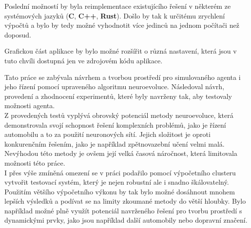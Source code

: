 Poslední možností by byla reimplementace existujícího řešení v některém ze systémových jazyků (\textbf{C}, \textbf{C++}, \textbf{Rust}). Došlo by tak k určitému zrychlení výpočtů a bylo by tedy možné vyhodnotit více jedinců na jednom počítači než doposud. 

Grafickou část aplikace by bylo možné rozšířit o různá nastavení, která jsou v tuto chvíli dostupná jen ve zdrojovém kódu aplikace.

Tato práce se zabývala návrhem a  tvorbou prostředí pro simulovaného agenta i jeho řízení pomocí upraveného algoritmu neuroevoluce. Následoval návrh, provedení a zhodnocení experimentů, které byly navrženy tak, aby testovaly možnosti agenta.\\
Z provedených testů vyplývá obrovský potenciál metody neuroevoluce, která demonstrovala svojí schopnost řešení komplexních problémů, jako je řízení automobilu a to za použití neuronových sítí.  Jejich složitost je oproti konkurenčním řešením, jako je například zpětnovazební učení velmi malá.\\
Nevýhodou této metody je ovšem její velká časová náročnost, která limitovala možnosti této práce.\\
I přes výše zmíněná omezení se v práci podařilo pomocí výpočetního clusteru vytvořit testovací systém, který je nejen robustní ale i snadno škálovatelný. Použitím většího výpočetního výkonu by tak bylo možné dosáhnout mnohem lepších výsledků a podívat se na limity zkoumané metody do větší hloubky. Bylo například možné plně využít potenciál navrženého řešení pro tvorbu prostředí s dynamickými prvky, jako jsou například další automobily nebo dopravní značení.
